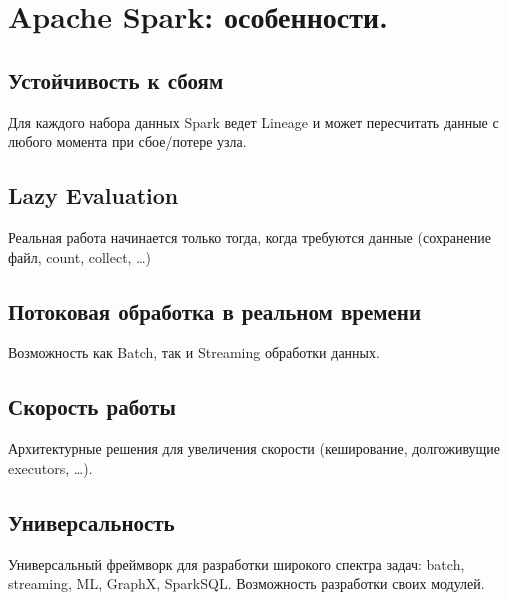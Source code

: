 \section{Apache Spark: особенности.}

\subsection*{Устойчивость к сбоям}

Для каждого набора данных Spark ведет Lineage и может
пересчитать данные с любого момента при сбое/потере узла.

\subsection*{Lazy Evaluation}

Реальная работа начинается только тогда, когда требуются
данные (сохранение файл, count, collect, …)

\subsection*{Потоковая обработка в реальном времени}

Возможность как Batch, так и Streaming обработки данных.

\subsection*{Скорость работы}

Архитектурные решения для увеличения скорости
(кеширование, долгоживущие executors, …).

\subsection*{Универсальность}

Универсальный фреймворк для разработки широкого спектра 
задач: batch, streaming, ML, GraphX, SparkSQL. Возможность 
разработки своих модулей.
